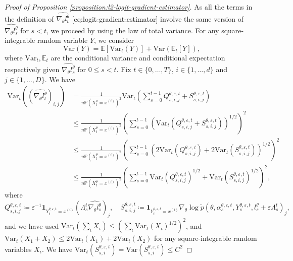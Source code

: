 \documentclass[11pt]{article}
\numberwithin{equation}{section}
\theoremstyle{definition}
\theoremstyle{remark}
\def\eps{\varepsilon}
\def\var{{\mathrm{Var}}}
\begin{document}
\begin{proof}[Proof of Proposition \ref{proposition:l2-logit-gradient-estimator}]
As all the terms in the definition of $\widehat{\nabla _\theta l_t^\theta}$ \eqref{eq:logit-gradient-estimator} involve the same version of $\widehat{\nabla_\theta l_s^\theta}$ for $s < t$, we proceed by using the law of total variance. For any square-integrable random variable $Y$, we consider
\[
\var ( Y ) = \mathbb E \left[ \var_{t}(Y) \right] + \var \left( \mathbb E_{t} \left[ Y \right] \right),
\]
where $\var_{t}, \mathbb E_t$ are the conditional variance and conditional expectation respectively given $\widehat{\nabla_\theta l_s^\theta}$ for $0 \leq s < t$.
Fix $t \in \{0, \ldots, T\}$, $i \in \{1, \ldots, d\}$ and $j \in \{1, \ldots, D\}$.
We have 
\[
\begin{aligned}
    \var_t \left(\left(\widehat{\nabla_\theta l_t^\theta}\right)_{i,j}\right) &= 
    \frac{1}{n \mathbb P \left( X^\theta_t = x^{(i)} \right)^2} \var_t \left(  \sum_{s=0}^{t-1}  Q_{s,i,j}^{\theta, \eps, t} + S_{s,i,j}^{\theta, \eps, t} \right) \\
    & \leq \frac{1}{n \mathbb P \left( X^\theta_t = x^{(i)} \right)^2} \left( \sum_{s=0}^{t-1} \left( \var_t \left( Q_{s,i,j}^{\theta, \eps, t} + S_{s,i,j}^{\theta, \eps, t} \right) \right)^{1/2} \right)^2 \\
    & \leq \frac{1}{n \mathbb P \left( X^\theta_t = x^{(i)} \right)^2} \left( \sum_{s=0}^{t-1} \left(2 \var_t \left( Q_{s,i,j}^{\theta, \eps, t} \right) + 2 \var_t \left( S_{s,i,j}^{\theta, \eps, t} \right) \right)^{1/2} \right)^2 \\
    & \leq \frac{1}{n \mathbb P \left( X^\theta_t = x^{(i)} \right)^2} \left( \sum_{s=0}^{t-1}  \var_t \left( Q_{s,i,j}^{\theta, \eps, t} \right)^{1/2} + \var_t \left( S_{s,i,j}^{\theta, \eps, t} \right)^{1/2}  \right)^2,
\end{aligned}
\]
where
\[
    Q_{s,i,j}^{\theta, \eps, t} \coloneq \eps^{-1} \mathbf 1_{Y_{t}^{\theta, \eps, t} = x^{(i)}} \left(\Lambda_s^{t} \widehat{\nabla_\theta l^\theta_s}\right)_j,
     \quad S_{s,i,j}^{\theta, \eps, t} \coloneq \mathbf 1_{Y_{t}^{\theta, \eps, t} = x^{(i)}} \nabla_\theta \log \tilde p (\theta, \alpha_s^{\theta, \eps,t}, Y_s^{\theta, \eps,t}, l_s^\theta + \eps \Lambda_s^{t})_j,
\]
and we have used $\var_t (\sum_\iota X_\iota) \leq (\sum_\iota \var_t (X_\iota)^{1/2})^2$, and $\var_t (X_1 + X_2) \leq 2 \var_t (X_1) + 2 \var_t (X_2)$ for any square-integrable random variables $X_\iota$.
We have $\var_t ( S_{s,i}^{\theta, \eps, t} ) =  \var ( S_{s,i}^{\theta, \eps, t} ) \leq C^2$

\end{proof}
\end{document}
